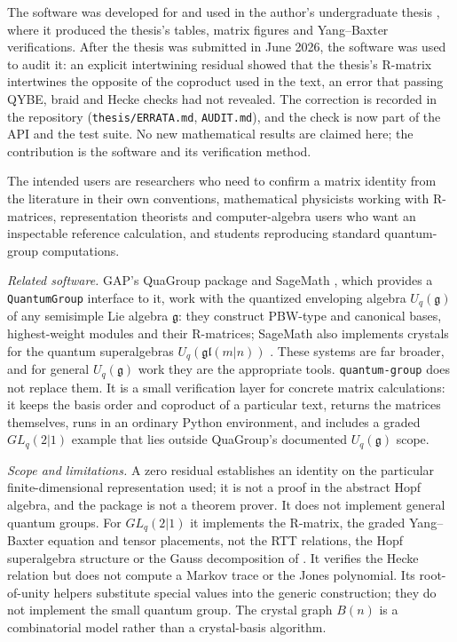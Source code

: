 \documentclass[11pt,a4paper]{article}
\newcommand{\pkg}{\texttt{quantum-group}}
\newcommand{\code}[1]{\texttt{#1}}
\newcommand{\GL}{GL_q(2|1)}
\begin{document}
The software was developed for and used in the author's undergraduate thesis \cite{terekli2026thesis}, where it produced the thesis's tables, matrix figures and Yang--Baxter verifications. After the thesis was submitted in June 2026, the software was used to audit it: an explicit intertwining residual showed that the thesis's R-matrix intertwines the opposite of the coproduct used in the text, an error that passing QYBE, braid and Hecke checks had not revealed. The correction is recorded in the repository (\code{thesis/ERRATA.md}, \code{AUDIT.md}), and the check is now part of the API and the test suite. No new mathematical results are claimed here; the contribution is the software and its verification method.

The intended users are researchers who need to confirm a matrix identity from the literature in their own conventions, mathematical physicists working with R-matrices, representation theorists and computer-algebra users who want an inspectable reference calculation, and students reproducing standard quantum-group computations.

\emph{Related software.} GAP's QuaGroup package \cite{gap,quagroup,degraaf2001} and SageMath \cite{sagemath}, which provides a \code{QuantumGroup} interface to it, work with the quantized enveloping algebra $U_q(\mathfrak{g})$ of any semisimple Lie algebra $\mathfrak{g}$: they construct PBW-type and canonical bases, highest-weight modules and their R-matrices; SageMath also implements crystals for the quantum superalgebras $U_q(\mathfrak{gl}(m|n))$ \cite{bkk2000}. These systems are far broader, and for general $U_q(\mathfrak{g})$ work they are the appropriate tools. \pkg{} does not replace them. It is a small verification layer for concrete matrix calculations: it keeps the basis order and coproduct of a particular text, returns the matrices themselves, runs in an ordinary Python environment, and includes a graded $\GL$ example that lies outside QuaGroup's documented $U_q(\mathfrak{g})$ scope.

\emph{Scope and limitations.} A zero residual establishes an identity on the particular finite-dimensional representation used; it is not a proof in the abstract Hopf algebra, and the package is not a theorem prover. It does not implement general quantum groups. For $\GL$ it implements the R-matrix, the graded Yang--Baxter equation and tensor placements, not the RTT relations, the Hopf superalgebra structure or the Gauss decomposition of \cite{celik2021}. It verifies the Hecke relation but does not compute a Markov trace or the Jones polynomial. Its root-of-unity helpers substitute special values into the generic construction; they do not implement the small quantum group. The crystal graph $B(n)$ is a combinatorial model rather than a crystal-basis algorithm.
\end{document}
